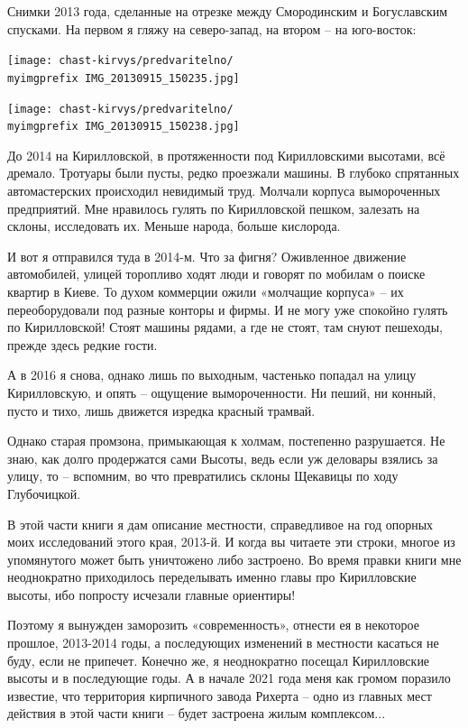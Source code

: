 Снимки 2013 года, сделанные на отрезке между Смородинским и Богуславским спусками. На первом я гляжу на северо-запад, на втором – на юго-восток:

\begin{center}
\texttt{[image: chast-kirvys/predvaritelno/\\myimgprefix IMG\_20130915\_150235.jpg]}
\end{center}

\begin{center}
\texttt{[image: chast-kirvys/predvaritelno/\\myimgprefix IMG\_20130915\_150238.jpg]}
\end{center}

\newpage

До 2014 на Кирилловской, в протяженности под Кирилловскими высотами, всё дремало. Тротуары были пусты, редко проезжали машины. В глубоко спрятанных автомастерских происходил невидимый труд. Молчали корпуса вымороченных предприятий. Мне нравилось гулять по Кирилловской пешком, залезать на склоны, исследовать их. Меньше народа, больше кислорода.
 
И вот я отправился туда в 2014-м. Что за фигня? Оживленное движение автомобилей, улицей торопливо ходят люди и говорят по мобилам о поиске квартир в Киеве. То духом коммерции ожили «молчащие корпуса» – их переоборудовали под разные конторы и фирмы. И не могу уже спокойно гулять по Кирилловской! Стоят машины рядами, а где не стоят, там снуют пешеходы, прежде здесь редкие гости.

А в 2016 я снова, однако лишь по выходным, частенько попадал на улицу Кирилловскую, и опять – ощущение вымороченности. Ни пеший, ни конный, пусто и тихо, лишь движется изредка красный трамвай.

Однако старая промзона, примыкающая к холмам, постепенно разрушается. Не знаю, как долго продержатся сами Высоты, ведь если уж деловары взялись за улицу, то – вспомним, во что превратились склоны Щекавицы по ходу Глубочицкой.

В этой части книги я дам описание местности, справедливое на год опорных моих исследований этого края, 2013-й. И когда вы читаете эти строки, многое из упомянутого может быть уничтожено либо застроено. Во время правки книги мне неоднократно приходилось переделывать именно главы про Кирилловские высоты, ибо попросту исчезали главные ориентиры!

Поэтому я вынужден заморозить «современность», отнести ея в некоторое прошлое, 2013-2014 годы, а последующих изменений в местности касаться не буду, если не припечет. Конечно же, я неоднократно посещал Кирилловские высоты и в последующие годы. А в начале 2021 года меня как громом поразило известие, что территория кирпичного завода Рихерта – одно из главных мест действия в этой части книги – будет застроена жилым комплексом...

